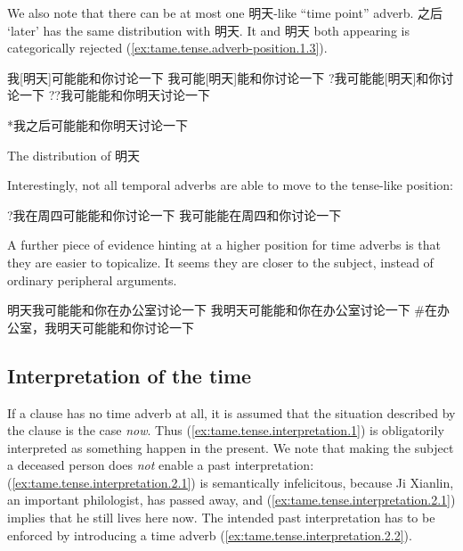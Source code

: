 \documentclass[UTF8, a4paper, oneside, scheme=plain, 12pt]{ctexrep}
\newcommand{\translate}[1]{`#1'}
\begin{document}
We also note that there can be at most one 明天-like ``time point'' adverb.
之后 \translate{later} has the same distribution with 明天.
It and 明天 both appearing is categorically rejected 
(\ref{ex:tame.tense.adverb-position.1.3}).

\begin{exe}
    \ex\label{ex:tame.tense.adverb-position.1.var} \begin{xlist}
        \ex 我[明天]可能能和你讨论一下
        \ex 我可能[明天]能和你讨论一下
        \ex ?我可能能[明天]和你讨论一下
        \ex ??我可能能和你明天讨论一下
    \end{xlist}

    \ex\label{ex:tame.tense.adverb-position.1.3} *我之后可能能和你明天讨论一下
\end{exe}

The distribution of 明天 

Interestingly, not all temporal adverbs are able to move to the tense-like position: 

\begin{exe}
    \ex \begin{xlist}
        \ex ?我在周四可能能和你讨论一下
        \ex 我可能能在周四和你讨论一下
    \end{xlist}
\end{exe}




A further piece of evidence hinting at a higher position for time adverbs 
is that they are easier to topicalize.
It seems they are closer to the subject, 
instead of ordinary peripheral arguments.

\begin{exe}
    \ex 明天我可能能和你在办公室讨论一下
    \ex 我明天可能能和你在办公室讨论一下
    \ex \#在办公室，我明天可能能和你讨论一下
\end{exe}


\subsection{Interpretation of the time}

If a clause has no time adverb at all,
it is assumed that the situation described by the clause 
is the case \emph{now}.
Thus (\ref{ex:tame.tense.interpretation.1}) is obligatorily interpreted as something happen in the present.
We note that making the subject a deceased person does \emph{not}
enable a past interpretation:
(\ref{ex:tame.tense.interpretation.2.1}) is semantically infelicitous,
because Ji Xianlin, an important philologist, has passed away,
and (\ref{ex:tame.tense.interpretation.2.1}) implies that he still lives here now.
The intended past interpretation has to be enforced by introducing a time adverb
(\ref{ex:tame.tense.interpretation.2.2}).
\end{document}
